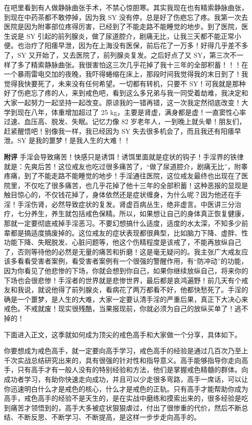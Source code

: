 \begin{case}
    在吧里看到有人做静脉曲张手术，不禁心惊胆寒。其实我现在也有精索静脉曲张，到现在中药茶都不敢停掉，因为我 SY 没有停，总是好了伤疤忘了疼。我第一次去医院是因为附睾部位疼得厉害，已经到了不能走路不能睡觉的地步。到了医院，医生说是 SY 引起的前列腺炎，做了尿道腔介，剧痛无比，让我三天都不能正常小便。也治疗了阳痿早泄，因为在上海没有医保，前后花了一万多！好得几乎差不多了，SY 又开始了，又去医院了，前列腺炎复发。之后好点了又 SY，第三次不一样了多了精索静脉曲张。我很害怕这三次几乎花掉了我十三年的全部积蓄！！！在一个暴雨雷电交加的夜晚，我吓得蜷缩在床上，那段时间我觉得我的末日到了！我觉得我快要死了，未来没有任何希望。一切都有转机，只要不 SY！可我就是那种好了伤疤忘了疼的人，来到戒色吧，看到这么多兄弟与我一同受着劫难，我决定和大家一起努力一起坚持一起改变。原谅我的一错再错，这一次我定然彻底改变！大学到现在八年，体重增加超过了 25 \unit{\kg}，主要是肾虚，满身都是虚！一直窦性心率过速、血压高、脱发、失眠。记忆力像 82 岁老年人，一到晚上就头晕！朋友们，赶紧醒悟吧！别像我一样，我已经因为 SY 失去很多机会了，而且我还有阳痿早泄。SY 是我的噩梦！是我人生的大难！！

    \textbf{附评} 手淫会导致痛苦！快感只是诱饵！诱饵里面就是症状的钩子！手淫界的铁律就是：先爽后苦！这位戒友也吃过很多痛苦了，“做了尿道腔介，剧痛无比”，附睾疼痛，到了不能走路不能睡觉的地步！手淫通往医院，这位戒友最终也出现在了医院里，不仅吃了很多痛苦，也几乎花掉了他十三年的全部积蓄！这种恶报的显现是触目惊心的，不仅钱花掉了，身体依然还是症状缠身，为什么呢？因为他还在手淫！手淫伤肾，必然导致症状的复发。肾虚百病丛生，绝非虚言。中医讲三分治疗，七分养生，养生就包括戒色保精。所以，如果想让自己的身体真正恢复健康，那就一定要彻底戒掉手淫恶习。不要幻想搞什么适度，适度的水太深，不知多少前辈都是搞适度搞废掉的。这位戒友的症状表现都很典型，比如脑力下降、虚胖、性功能下降、失眠脱发、心脏问题等，他这个伤精程度是该戒了，不能再放纵自己了，否则等待他的必然是无量的痛苦和折磨！这是毫无疑问的。我主张广大戒友应该多看看受害者案例，看受害者案例有一个很强的警醒作用，有“防冲动”的功能，因为你看见了他悲惨的下场，你就会想到你自己，如果你继续放纵自己，将来你的下场也会很悲惨！手淫者的世界就是悲惨世界，最后都是哀鸿遍野！前几天有个戒友和我说，就说他得了前列腺炎，看病花了两万都看不好，他都快愁死了。手淫的确是一个噩梦，是人生的大难，大家一定要认清手淫的严重后果，真正下大决心来戒色。不戒就废！现实很残酷，当果报现前，你就必须为自己的放纵买单了！逃不掉的！
\end{case}

下面进入正文，这季就如何成为顶尖的戒色高手和大家做一个分享，具体如下。

你要想成为戒色高手，就一定要向高手学习，戒色高手的经验是通过几百次乃至上千次实战总结研究出来的，具有很强的针对性和指导意义。高手能够指导你走向高手，只有高手才有一般人没有的特别经验和方法，他们是掌握戒色精髓的群体。向成功者学习，有助你快速走向成功，并且可以少走很多弯路，高手一席话，可以让你迅速明白什么才是戒色的核心，什么才是戒色的正轨。只有高手才能帮助你成为高手，戒色高手的经验不是天生的，是在实战中磨练和摸索出来的，很多经验是吃到痛苦才领悟到的，高手大多被症状狠狠虐过，付出了很惨重的代价，然后不断总结、不断反思、不断学习、不断提高，是这样一步步走向高手的。

